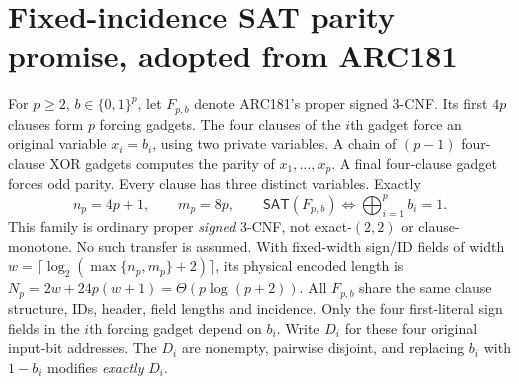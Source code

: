 \documentclass[11pt]{article}
\newcommand{\SAT}{\mathsf{SAT}}
\begin{document}
\section{Fixed-incidence SAT parity promise, adopted from ARC181}
For $p\ge2$, $b\in\{0,1\}^{p}$, let $F_{p,b}$ denote ARC181's proper signed 3-CNF. Its first $4p$ clauses form $p$ forcing gadgets. The four clauses of the $i$th gadget force an original variable $x_i=b_i$, using two private variables. A chain of $(p-1)$ four-clause XOR gadgets computes the parity of $x_1,\ldots,x_p$. A final four-clause gadget forces odd parity. Every clause has three distinct variables. Exactly
\[
 n_p=4p+1,\qquad m_p=8p,
 \qquad\SAT(F_{p,b})\iff \bigoplus_{i=1}^{p}b_i=1.
\]
This family is ordinary proper \emph{signed} 3-CNF, not exact-$(2,2)$ or clause-monotone. No such transfer is assumed. With fixed-width sign/ID fields of width $w=\lceil\log_2(\max\{n_p,m_p\}+2)\rceil$, its physical encoded length is $N_p=2w+24p(w+1)=\Theta(p\log(p+2))$. All $F_{p,b}$ share the same clause structure, IDs, header, field lengths and incidence. Only the four first-literal sign fields in the $i$th forcing gadget depend on $b_i$. Write $D_i$ for these four original input-bit addresses. The $D_i$ are nonempty, pairwise disjoint, and replacing $b_i$ with $1-b_i$ modifies \emph{exactly} $D_i$.
\end{document}
